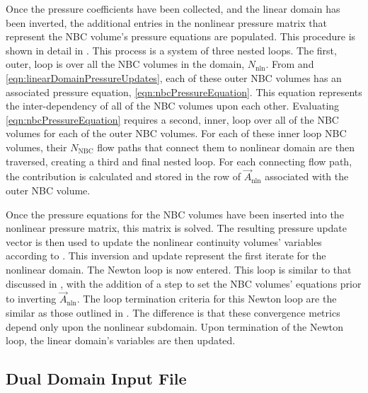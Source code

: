 Once the pressure coefficients have been collected, and the linear domain has been inverted, the additional entries in the nonlinear pressure matrix that represent the NBC volume's pressure equations are populated.
This procedure is shown in detail in .
This process is a system of three nested loops.
The first, outer, loop is over all the NBC volumes in the domain, $N_{\text{nln}}$.
From  and \eqref{eqn:linearDomainPressureUpdates}, each of these outer NBC volumes has an associated pressure equation, \eqref{eqn:nbcPressureEquation}.
This equation represents the inter-dependency of all of the NBC volumes upon each other.
Evaluating \eqref{eqn:nbcPressureEquation} requires a second, inner, loop over all of the NBC volumes for each of the outer NBC volumes.
For each of these inner loop NBC volumes, their $N_{\text{NBC}}$ flow paths that connect them to nonlinear domain are then traversed, creating a third and final nested loop.
For each connecting flow path, the contribution is calculated and stored in the row of $\vec{A}_{\text{nln}}$ associated with the outer NBC volume.

Once the pressure equations for the NBC volumes have been inserted into the nonlinear pressure matrix, this matrix is solved.
The resulting pressure update vector is then used to update the nonlinear continuity volumes' variables according to .
This inversion and update represent the first iterate for the nonlinear domain.
The Newton loop is now entered.
This loop is similar to that discussed in , with the addition of a step to set the NBC volumes' equations prior to inverting $\vec{A}_{\text{nln}}$.
The loop termination criteria for this Newton loop are the similar as those outlined in .
The difference is that these convergence metrics depend only upon the nonlinear subdomain.
Upon termination of the Newton loop, the linear domain's variables are then updated.

\subsection{Dual Domain Input File}
\label{subsect:domDecompInputFile}

